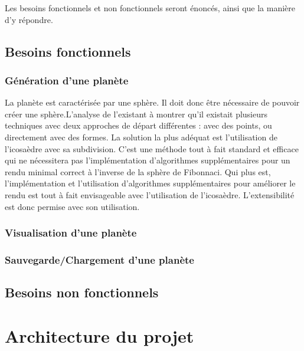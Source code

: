 \documentclass[a4paper]{article}
\begin{document}
Les besoins fonctionnels et non fonctionnels seront énoncés, ainsi que la manière d'y répondre.

\subsection{Besoins fonctionnels}

\subsubsection{Génération d'une planète}

\label{geo_planet}
La planète est caractérisée par une sphère. Il doit donc être nécessaire de pouvoir créer une sphère.L’analyse de l’existant à montrer qu’il existait plusieurs techniques avec deux approches de départ différentes : avec des points, ou directement avec des formes.  La solution la plus adéquat est l’utilisation de l’icosaèdre avec sa subdivision. C’est une méthode tout à fait standard et efficace qui ne nécessitera pas l’implémentation d’algorithmes supplémentaires pour un rendu minimal correct à l’inverse de la sphère de Fibonnaci. Qui plus est, l’implémentation et l’utilisation d’algorithmes supplémentaires pour améliorer le rendu est tout à fait envisageable avec l’utilisation de l’icosaèdre. L’extensibilité est donc permise avec son utilisation.

\label{besoin_paramètres}

\subsubsection{Visualisation d'une planète}
\subsubsection{Sauvegarde/Chargement d'une planète}

\subsection{Besoins non fonctionnels}


\section{Architecture du projet}
\end{document}
